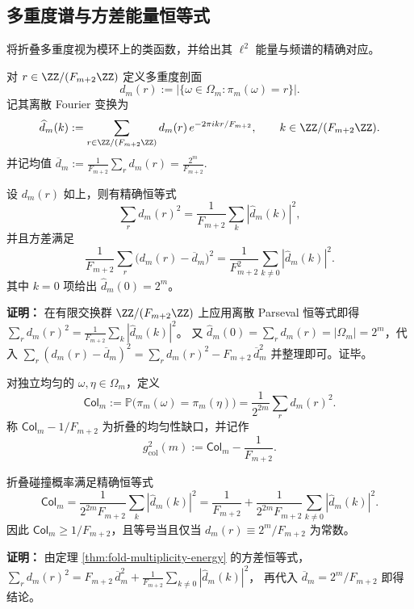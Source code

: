 \subsection{多重度谱与方差能量恒等式}
将折叠多重度视为模环上的类函数，并给出其 $\ell^2$ 能量与频谱的精确对应。

\begin{definition}[多重度谱]
对 $r\in\ZZ/(F_{m+2}\ZZ)$ 定义多重度剖面
\[
d_m(r):=\bigl|\{\omega\in\Omega_m:\pi_m(\omega)=r\}\bigr|.
\]
记其离散 Fourier 变换为
\[
\widehat d_m(k):=\sum_{r\in\ZZ/(F_{m+2}\ZZ)} d_m(r)\,e^{-2\pi i kr/F_{m+2}},
\qquad k\in\ZZ/(F_{m+2}\ZZ).
\]
并记均值
\(
\overline d_m:=\frac{1}{F_{m+2}}\sum_r d_m(r)=\frac{2^m}{F_{m+2}}.
\)
\end{definition}

\begin{theorem}[多重度能量与方差的谱表示]
\label{thm:fold-multiplicity-energy}
设 $d_m(r)$ 如上，则有精确恒等式
\[
\sum_{r} d_m(r)^2=\frac{1}{F_{m+2}}\sum_{k}|\widehat d_m(k)|^2,
\]
并且方差满足
\[
\frac{1}{F_{m+2}}\sum_r\bigl(d_m(r)-\overline d_m\bigr)^2
=\frac{1}{F_{m+2}^2}\sum_{k\ne 0}|\widehat d_m(k)|^2.
\]
其中 $k=0$ 项给出 $\widehat d_m(0)=2^m$。
\end{theorem}

\textbf{证明：}
在有限交换群 $\ZZ/(F_{m+2}\ZZ)$ 上应用离散 Parseval 恒等式即得
\(
\sum_r d_m(r)^2=\frac{1}{F_{m+2}}\sum_k|\widehat d_m(k)|^2
\)。
又 $\widehat d_m(0)=\sum_r d_m(r)=|\Omega_m|=2^m$，代入
\(
\sum_r(d_m(r)-\overline d_m)^2=\sum_r d_m(r)^2-F_{m+2}\,\overline d_m^2
\)
并整理即可。证毕。

\begin{definition}[折叠碰撞概率]
对独立均匀的 $\omega,\eta\in\Omega_m$，定义
\[
\mathsf{Col}_m:=\mathbb{P}\bigl(\pi_m(\omega)=\pi_m(\eta)\bigr)
=\frac{1}{2^{2m}}\sum_r d_m(r)^2.
\]
称 $\mathsf{Col}_m-1/F_{m+2}$ 为折叠的均匀性缺口，并记作
\[
g_{\mathrm{col}}^2(m):=\mathsf{Col}_m-\frac{1}{F_{m+2}}.
\]
\end{definition}

\begin{theorem}[碰撞概率的谱恒等式]
\label{thm:fold-collision-spectrum}
折叠碰撞概率满足精确恒等式
\[
\mathsf{Col}_m
=\frac{1}{2^{2m}F_{m+2}}\sum_{k}|\widehat d_m(k)|^2
=\frac{1}{F_{m+2}}+\frac{1}{2^{2m}F_{m+2}}\sum_{k\ne 0}|\widehat d_m(k)|^2.
\]
因此 $\mathsf{Col}_m\ge 1/F_{m+2}$，且等号当且仅当 $d_m(r)\equiv 2^m/F_{m+2}$ 为常数。
\end{theorem}

\textbf{证明：}
由定理 \ref{thm:fold-multiplicity-energy} 的方差恒等式，
\(
\sum_r d_m(r)^2=F_{m+2}\,\overline d_m^2+\frac{1}{F_{m+2}}\sum_{k\ne 0}|\widehat d_m(k)|^2
\)，
再代入 $\overline d_m=2^m/F_{m+2}$ 即得结论。

